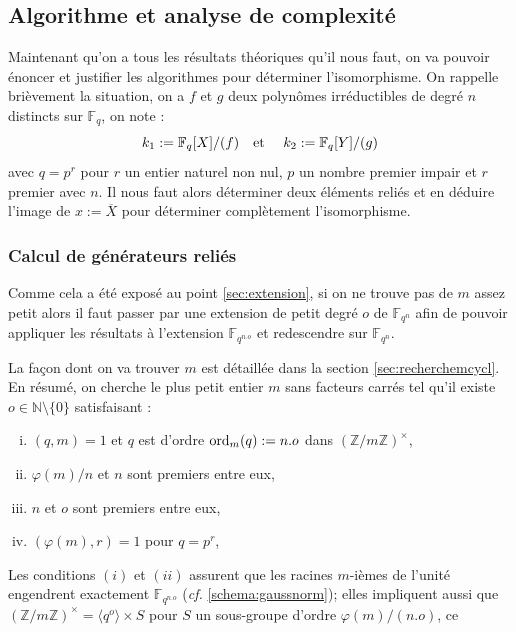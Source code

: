 \documentclass[a4paper]{article} %
\numberwithin{section}{part}
\numberwithin{equation}{section}
\newcommand\zmodninv[1]{(\mathbb{Z}/#1\mathbb{Z})^{\times}}
\newcommand\GF[1]{\mathbb{F}_{#1}}
\newcommand\NN{\mathbb{N}}
\newcommand\etmath{\textup{\quad et \quad}}
\newcommand\groupgen[1]{\langle{#1}\rangle}
\newcommand\ord[2]{\textup{ord}_{#1}(#2)}
\begin{document}
\subsection{Algorithme et analyse de complexité}
\label{sec:algcompcycl}
Maintenant qu'on a tous les résultats théoriques qu'il nous faut, on va pouvoir
énoncer et justifier les algorithmes pour déterminer l'isomorphisme. 
On rappelle brièvement la situation, on a $f$ et $g$ deux polynômes 
irréductibles de degré $n$ distincts sur $\GF{q}$, on note :
\[k_1 := \GF{q}[X]/(f)\etmath k_2 := \GF{q}[Y]/(g)\]
avec $q = p^r$ pour $r$ un entier naturel non nul, $p$ un nombre premier
impair et $r$ premier avec $n$. Il nous faut alors déterminer deux éléments 
reliés et en déduire l'image de $x := \overline{X}$ pour déterminer complètement
l'isomorphisme. 

\subsubsection*{Calcul de générateurs reliés}
Comme cela a été exposé au point \ref{sec:extension}, si on ne trouve pas de $m$
assez petit alors il faut passer par une extension de petit degré $o$ de
$\GF{q^n}$ afin de pouvoir appliquer les résultats à l'extension $\GF{q^{n.o}}$
et redescendre sur $\GF{q^n}$.\par
La façon dont on va trouver $m$ est détaillée dans la section
\ref{sec:recherchemcycl}. En résumé, on cherche le plus petit entier
$m$ sans facteurs carrés tel qu'il existe $o\in\NN\setminus\lbrace{0}\rbrace$ 
satisfaisant :
\vspace{0.3cm}
\begin{enumerate}[(i)]
    \item $(q, m) = 1$ et $q$ est d'ordre $\ord{m}{q} :=n.o$ dans 
    $\zmodninv{m}$,
    \item $\varphi(m)/n$ et $n$ sont premiers entre eux,
    \item $n$ et $o$ sont premiers entre eux,
    \item $(\varphi(m), r) = 1$ pour $q = p^r$,
\end{enumerate}
\vspace{0.3cm}
Les conditions $(i)$ et $(ii)$ assurent que les racines $m$-ièmes de l'unité
engendrent exactement $\GF{q^{n.o}}$ (\emph{cf.} 
\ref{schema:gaussnorm}); elles impliquent aussi que $\zmodninv{m} =
\groupgen{q^o}\times S$ pour $S$ un sous-groupe d'ordre $\varphi(m)/(n.o)$, ce
\end{document}
